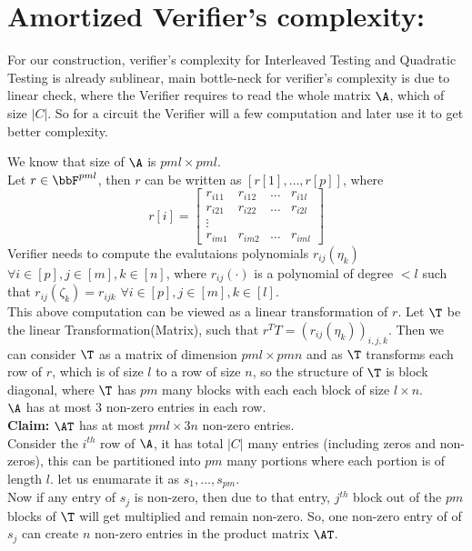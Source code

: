 \section{Amortized Verifier's complexity:}

For our construction, verifier's complexity for Interleaved Testing and Quadratic Testing is already sublinear, main bottle-neck for verifier's complexity is due to linear check, where the Verifier requires to read the whole matrix $\A$, which of size $|C|$. So for a circuit the Verifier will a few computation and later use it to get better complexity.

We know that size of $\A$ is $pml \times pml$.\\
Let $r\in \bbF^{pml}$, then $r$ can be written as $[r[1],\ldots, r[p]]$,
where $$r[i]=
\begin{bmatrix}
r_{i11} & r_{i12} & \ldots & r_{i1l}\\
r_{i21} & r_{i22} & \ldots & r_{i2l}\\
\vdots\\
r_{im1} & r_{im2} & \ldots & r_{iml}
\end{bmatrix}
$$
Verifier needs to compute the evalutaions polynomials $r_{ij}(\eta_k)$ $\forall i\in [p], j\in [m], k\in [n]$, where $r_{ij}(\cdot)$ is a polynomial of degree $<l$ such that $r_{ij}(\zeta_k)=r_{ijk}$ $\forall i\in [p],j\in [m],k\in [l]$.\\
This above computation can be viewed as a linear transformation of $r$. Let $\T$ be the linear Transformation(Matrix), such that $r^TT=(r_{ij}(\eta_k))_{i,j,k}$.
Then we can consider $\T$ as a matrix of dimension $pml\times pmn$ and as $\T$ transforms each row of $r$, which is of size $l$ to a row of size $n$, so the structure of $\T$ is block diagonal, where $\T$ has $pm$ many blocks with each each block of size $l\times n$.\\
$\A$ has at most 3 non-zero entries in each row.\\
\textbf{Claim:} $\AT$ has at most $pml \times 3n$ non-zero entries.\\
Consider the $i^{th}$ row of $\A$, it has total $|C|$ many entries (including zeros and non-zeros), this can be partitioned into $pm$ many portions where each portion is of length $l$. let us enumarate it as $s_1,\ldots, s_{pm}$.\\
Now if any entry of $s_j$ is non-zero, then due to that entry, $j^{th}$ block out of the $pm$ blocks of $\T$ will get multiplied and remain non-zero. So, one non-zero entry of of $s_j$ can create $n$ non-zero entries in the product matrix $\AT$.\\
